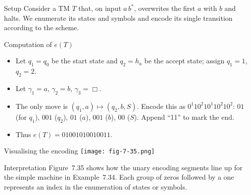 \begin{frame}[t]{}
  \begin{tblock}{Setup}
    Consider a TM $T$ that, on input $a\,b^*$, overwrites the first
    $a$ with $b$ and halts.  We enumerate its states and symbols and
    encode its single transition according to the scheme.
  \end{tblock}
  \begin{tblock}{Computation of $e(T)$}
    \begin{itemize}
      \item Let $q_1=q_0$ be the start state and $q_2=h_a$ be the
        accept state; assign $q_1=1$, $q_2=2$.
      \item Let $\gamma_1=a$, $\gamma_2=b$, $\gamma_3=\Box$.
      \item The only move is $(q_1,a)\mapsto(q_2,b,S)$.  Encode this
        as $0^1 1 0^2 1 0^1 1 0^2 1 0^2$:
        $0 1$ (for $q_1$), $00 1$ ($q_2$), $0 1$ ($a$), $00 1$ ($b$),
        $00$ ($S$).  Append “11” to mark the end.
      \item Thus $e(T) = 0 1 00 1 0 1 00 1 00 11$.
    \end{itemize}
  \end{tblock}
  \label{fr:7.8-04}
\end{frame}

\begin{frame}[t]{Visualising the encoding}
  \centering
  \texttt{[image: fig-7-35.png]} %
  \begin{tblock}{Interpretation}
    Figure 7.35 shows how the unary encoding segments line up for the
    simple machine in Example 7.34.  Each group of zeros followed by
    a one represents an index in the enumeration of states or symbols.
  \end{tblock}
  \label{fr:7.8-05}
\end{frame}

